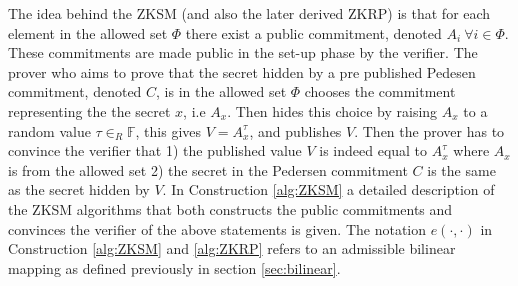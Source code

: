 The idea behind the ZKSM (and also the later derived ZKRP) is that for each element in the allowed set $\Phi$ there exist a public commitment, denoted $A_i\: \forall i\in\Phi$.  These commitments are made public in the set-up phase by the verifier. The prover who aims to prove that the secret hidden by a pre published Pedesen commitment, denoted $C$, is in the allowed set $\Phi$ chooses the commitment representing the the secret $x$, i.e $A_x$. Then hides this choice by raising $A_x$  to a random value $\tau\in_R\mathds{F}$, this gives $V = A_x^\tau$, and publishes $V$. Then the prover has to convince the verifier that  1) the published value $V$ is indeed equal to  $A_x^\tau$ where $A_x$ is from the allowed set  2) the secret in the Pedersen commitment $C$  is the same as the secret hidden by $V$.
In Construction \ref{alg:ZKSM}  a detailed description of the ZKSM algorithms that both constructs the public commitments and convinces the verifier of the above statements is given.  The notation $e(\cdot,\cdot)$ in Construction \ref{alg:ZKSM} and \ref{alg:ZKRP} refers to an admissible bilinear mapping as defined previously in section \ref{sec:bilinear}.
